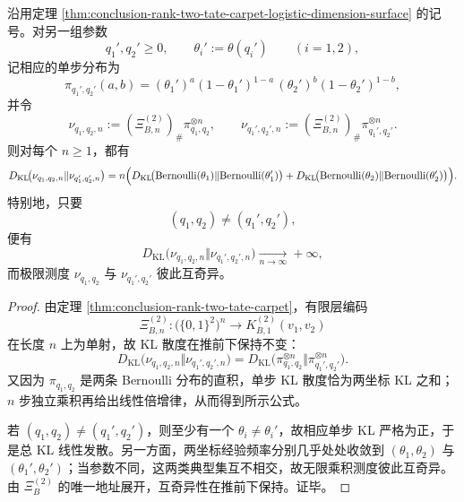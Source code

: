 \begin{theorem}\label{thm:conclusion-rank-two-tate-carpet-finitelevel-kl-additivity}
沿用定理 \ref{thm:conclusion-rank-two-tate-carpet-logistic-dimension-surface} 的记号。对另一组参数
\[
q_1',q_2'\ge 0,
\qquad
\theta_i':=\theta(q_i')
\qquad(i=1,2),
\]
记相应的单步分布为
\[
\pi_{q_1',q_2'}(a,b)
=
(\theta_1')^a(1-\theta_1')^{1-a}\,
(\theta_2')^b(1-\theta_2')^{1-b},
\]
并令
\[
\nu_{q_1,q_2,n}
:=
(\Xi_{B,n}^{(2)})_\#\pi_{q_1,q_2}^{\otimes n},
\qquad
\nu_{q_1',q_2',n}
:=
(\Xi_{B,n}^{(2)})_\#\pi_{q_1',q_2'}^{\otimes n}.
\]
则对每个 \(n\ge 1\)，都有
\[
D_{\mathrm{KL}}\!\bigl(
\nu_{q_1,q_2,n}\Vert \nu_{q_1',q_2',n}
\bigr)
=
n\Bigl(
D_{\mathrm{KL}}\!\bigl(\mathrm{Bernoulli}(\theta_1)\Vert \mathrm{Bernoulli}(\theta_1')\bigr)
+
D_{\mathrm{KL}}\!\bigl(\mathrm{Bernoulli}(\theta_2)\Vert \mathrm{Bernoulli}(\theta_2')\bigr)
\Bigr).
\]
特别地，只要
\[
(q_1,q_2)\neq (q_1',q_2'),
\]
便有
\[
D_{\mathrm{KL}}\!\bigl(
\nu_{q_1,q_2,n}\Vert \nu_{q_1',q_2',n}
\bigr)\xrightarrow[n\to\infty]{}+\infty,
\]
而极限测度 \(\nu_{q_1,q_2}\) 与 \(\nu_{q_1',q_2'}\) 彼此互奇异。
\end{theorem}
\begin{proof}
由定理 \ref{thm:conclusion-rank-two-tate-carpet}，有限层编码
\[
\Xi_{B,n}^{(2)}:\bigl(\{0,1\}^2\bigr)^n\to K_{B,1}^{(2)}(v_1,v_2)
\]
在长度 \(n\) 上为单射，故 KL 散度在推前下保持不变：
\[
D_{\mathrm{KL}}\!\bigl(
\nu_{q_1,q_2,n}\Vert \nu_{q_1',q_2',n}
\bigr)
=
D_{\mathrm{KL}}\!\bigl(
\pi_{q_1,q_2}^{\otimes n}\Vert \pi_{q_1',q_2'}^{\otimes n}
\bigr).
\]
又因为 \(\pi_{q_1,q_2}\) 是两条 Bernoulli 分布的直积，单步 KL 散度恰为两坐标 KL 之和；\(n\) 步独立乘积再给出线性倍增律，从而得到所示公式。

若 \((q_1,q_2)\neq(q_1',q_2')\)，则至少有一个 \(\theta_i\neq \theta_i'\)，故相应单步 KL 严格为正，于是总 KL 线性发散。另一方面，两坐标经验频率分别几乎处处收敛到 \((\theta_1,\theta_2)\) 与 \((\theta_1',\theta_2')\)；当参数不同，这两类典型集互不相交，故无限乘积测度彼此互奇异。由 \(\Xi_B^{(2)}\) 的唯一地址展开，互奇异性在推前下保持。证毕。
\end{proof}

